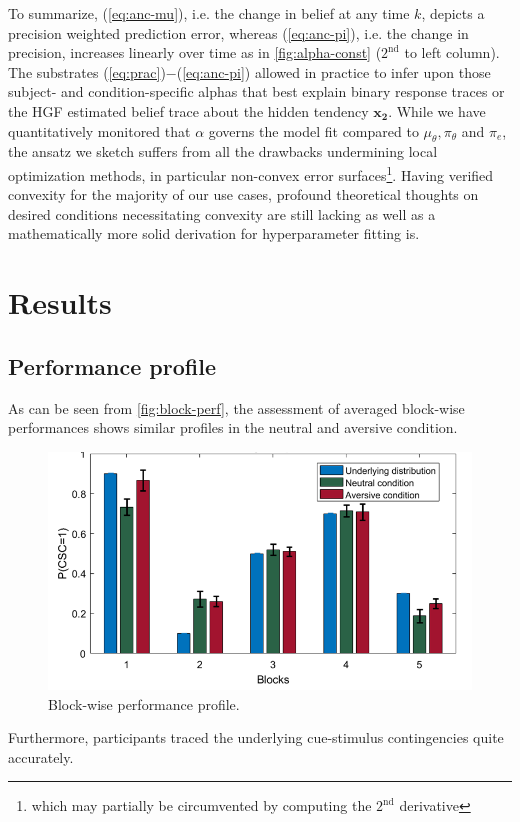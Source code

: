 \documentclass{article}
\begin{document}
\begin{multicols}{2}
To summarize, (\ref{eq:anc-mu}), i.e. the change in belief at any time $k$, depicts a precision weighted prediction error, whereas (\ref{eq:anc-pi}), i.e. the change in precision, increases linearly over time as in \autoref{fig:alpha-const} ($2^{\text{nd}}$ to left column). The substrates (\ref{eq:prac})$-$(\ref{eq:anc-pi}) allowed in practice to infer upon those subject- and condition-specific alphas that best explain binary response traces or the HGF estimated belief trace about the hidden tendency $\boldsymbol{x_2}$. While we have quantitatively monitored that $\alpha$ governs the model fit compared to $\mu_{\theta}, \pi_{\theta}$ and $\pi_e$, the ansatz we sketch suffers from all the drawbacks undermining local optimization methods, in particular non-convex error surfaces\footnote{which may partially be circumvented by computing the $2^{\text{nd}}$ derivative}. Having verified convexity for the majority of our use cases, profound theoretical thoughts on desired conditions necessitating convexity are still lacking as well as a mathematically more solid derivation for hyperparameter fitting is.

\section*{Results}
\label{sec:res}



\subsection*{Performance profile}

As can be seen from \autoref{fig:block-perf}, the assessment of averaged block-wise performances shows similar profiles in the neutral and aversive condition. 

\begin{figure}[H]
\centering
\includegraphics[width=.5\textwidth]{group_performance_score.png}
  \caption{Block-wise performance profile.}
  \label{fig:block-perf}
\end{figure}%
Furthermore, participants traced the underlying cue-stimulus contingencies quite accurately. 


\end{multicols}
\end{document}
